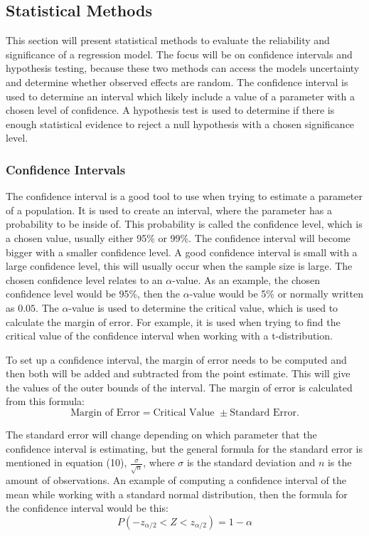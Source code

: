 \subsection{Statistical Methods}
This section will present statistical methods to evaluate the reliability and significance of a regression model. The focus will be on confidence intervals and hypothesis testing, because these two methods can access the models uncertainty and determine whether observed effects are random. The confidence interval is used to determine an interval which likely include a value of a parameter with a chosen level of confidence. A hypothesis test is used to determine if there is enough statistical evidence to reject a null hypothesis with a chosen significance level.

\subsubsection{Confidence Intervals}
The confidence interval is a good tool to use when trying to estimate a parameter of a population. It is used to create an interval, where the parameter has a probability to be inside of. This probability is called the confidence level, which is a chosen value, usually either 95\% or 99\%. The confidence interval will become bigger with a smaller confidence level. A good confidence interval is small with a large confidence level, this will usually occur when the sample size is large. The chosen confidence level relates to an $\alpha$-value. As an example, the chosen confidence level would be 95\%, then the $\alpha$-value would be 5\% or normally written as $0.05$. The $\alpha$-value is used to determine the critical value, which is used to calculate the margin of error. For example, it is used when trying to find the critical value of the confidence interval when working with a t-distribution.
\newline

\noindent To set up a confidence interval, the margin of error needs to be computed and then both will be added and subtracted from the point estimate. This will give the values of the outer bounds of the interval. The margin of error is calculated from this formula:
\begin{equation}
	\text{Margin of Error} = \text{Critical Value } \pm \text{Standard Error}.
\end{equation}

\noindent The standard error will change depending on which parameter that the confidence interval is estimating, but the general formula for the standard error is mentioned in equation (10), $\frac{\sigma}{\sqrt{n}}$, where $\sigma$ is the standard deviation and $n$ is the amount of observations. An example of computing a confidence interval of the mean while working with a standard normal distribution, then the formula for the confidence interval would be this:
\begin{equation}
P(-z_{\alpha/2}<Z<z_{\alpha/2}) = 1-\alpha
\end{equation}


